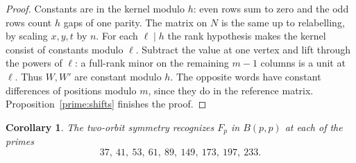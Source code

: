 \documentclass[11pt,a4paper]{article}
\newtheorem{corollary}[theorem]{Corollary}
\numberwithin{equation}{section}
\begin{document}
\begin{proof}
Constants are in the kernel modulo $h$: even rows sum to zero and the odd rows count $h$ gaps of one parity. The matrix on $N$ is the same up to relabelling, by scaling $x,y,t$ by $n$. For each $\ell\mid h$ the rank hypothesis makes the kernel consist of constants modulo $\ell$. Subtract the value at one vertex and lift through the powers of $\ell$: a full-rank minor on the remaining $m-1$ columns is a unit at $\ell$. Thus $W,W'$ are constant modulo $h$. The opposite words have constant differences of positions modulo $m$, since they do in the reference matrix. Proposition~\ref{prime:shifts} finishes the proof.
\end{proof}

\begin{corollary}\label{prime:even-orders}
The two-orbit symmetry recognizes $F_p$ in $B(p,p)$ at each of the primes
$$37,\ 41,\ 53,\ 61,\ 89,\ 149,\ 173,\ 197,\ 233.$$
\end{corollary}
\end{document}
